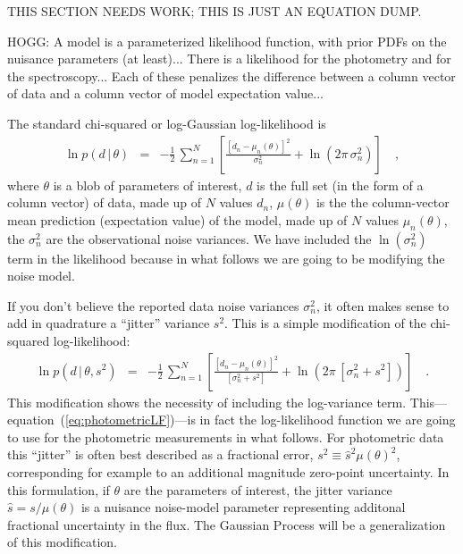 \documentclass[iop,numberedappendix]{emulateapj}
\newcommand{\given}{\,|\,}
\begin{document}
THIS SECTION NEEDS WORK; THIS IS JUST AN EQUATION DUMP.

HOGG: A model is a parameterized likelihood function, with prior PDFs
on the nuisance parameters (at least)...  There is a likelihood for
the photometry and for the spectroscopy...  Each of these penalizes
the difference between a column vector of data and a column vector of
model expectation value...

The standard chi-squared or log-Gaussian log-likelihood is
\begin{eqnarray}
\ln p(d\given\theta) &=& -\frac{1}{2}\,\sum_{n=1}^N \left[\frac{[d_n - \mu_n(\theta)]^2}{\sigma_n^2} + \ln(2\pi\,\sigma_n^2) \right]
\quad ,
\end{eqnarray}
where $\theta$ is a blob of parameters of interest,
$d$ is the full set (in the form of a column vector) of data,
made up of $N$ values $d_n$,
$\mu(\theta)$ is the the column-vector mean prediction (expectation value) of the model,
made up of $N$ values $\mu_n(\theta)$,
the $\sigma_n^2$ are the observational noise variances.
We have included the $\ln(\sigma_n^2)$ term in the likelihood because
in what follows we are going to be modifying the noise model.

If you don't believe the reported data noise variances $\sigma_n^2$,
it often makes sense to add in quadrature a ``jitter'' variance $s^2$.
This is a simple modification of the chi-squared log-likelihood:
\begin{eqnarray}\label{eq:photometricLF}
\ln p(d\given\theta,s^2) &=& -\frac{1}{2}\,\sum_{n=1}^N
                             \left[\frac{[d_n - \mu_n(\theta)]^2}
                             {[\sigma_n^2 + s^2]} + 
                             \ln(2\pi\,[\sigma_n^2 + s^2]) \right]
\quad .
\end{eqnarray}
This modification shows the necessity of including the log-variance
term.
This---equation~(\ref{eq:photometricLF})---is in fact the
log-likelihood function we are going to use for the photometric
measurements in what follows.  For photometric data this ``jitter'' is
often best described as a fractional error, $s^2 \equiv
\hat{s}^2\mu(\theta)^2$, corresponding for example to an additional
magnitude zero-point uncertainty.  In this formulation, if $\theta$
are the parameters of interest, the jitter variance $\hat{s} =
s/\mu(\theta)$ is a nuisance noise-model parameter representing
additonal fractional uncertainty in the flux.  The Gaussian Process
will be a generalization of this modification.
\end{document}
